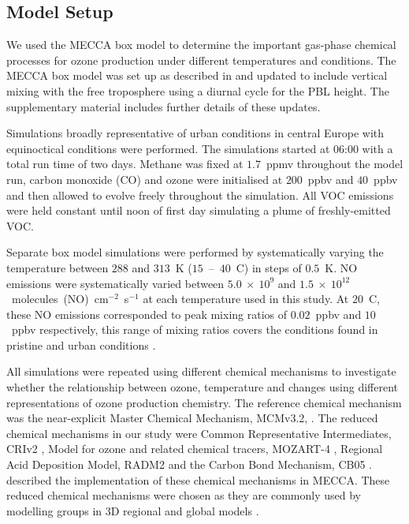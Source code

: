 \subsection{Model Setup} \label{ss:model_setup}
We used the MECCA box model \citep{Sander:2005} to determine the important gas-phase chemical processes for ozone production under different temperatures and  conditions.
The MECCA box model was set up as described in \citet{Coates:2015} and updated to include vertical mixing with the free troposphere using a diurnal cycle for the PBL height.
The supplementary material includes further details of these updates.

Simulations broadly representative of urban conditions in central Europe with equinoctical conditions were performed. 
The simulations started at 06:00 with a total run time of two days.
Methane was fixed at $1.7$~ppmv throughout the model run, carbon monoxide (CO) and ozone were initialised at $200$~ppbv and $40$~ppbv and then allowed to evolve freely throughout the simulation.
All VOC emissions were held constant until noon of first day simulating a plume of freshly-emitted VOC.

Separate box model simulations were performed by systematically varying the temperature between $288$ and $313$~K ($15$~--~$40$~\degree C) in steps of $0.5$~K. 
NO emissions were systematically varied between $5.0~\times~10^9$ and $1.5~\times~10^{12}$~molecules~(NO)~cm$^{-2}$~s$^{-1}$ at each temperature used in this study.
At $20$~\degree C, these NO emissions corresponded to peak  mixing ratios of $0.02$~ppbv and $10$~ppbv respectively, this range of  mixing ratios covers the  conditions found in pristine and urban conditions \citep{vonSchneidemesser:2015}.

All simulations were repeated using different chemical mechanisms to investigate whether the relationship between ozone, temperature and  changes using different representations of ozone production chemistry.
The reference chemical mechanism was the near-explicit Master Chemical Mechanism, MCMv3.2, \citep{Jenkin:1997, Jenkin:2003, Saunders:2003, MCM_Site}.
The reduced chemical mechanisms in our study were Common Representative Intermediates, CRIv2 \citep{Jenkin:2008}, Model for ozone and related chemical tracers, MOZART-4 \citep{Emmons:2010}, Regional Acid Deposition Model, RADM2 \citep{Stockwell:1990} and the Carbon Bond Mechanism, CB05 \citep{Yarwood:2005}. 
\citet{Coates:2015} described the implementation of these chemical mechanisms in MECCA.
These reduced chemical mechanisms were chosen as they are commonly used by modelling groups in 3D regional and global models \citep{Baklanov:2014}.

